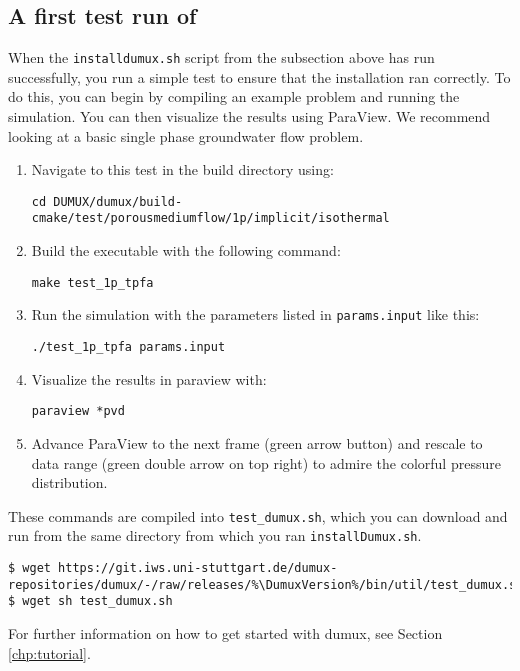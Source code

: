 \subsection{A first test run of \Dumux}
When the \texttt{installdumux.sh} script from the subsection above has run successfully,
you run a simple test to ensure that the installation ran correctly. To do this, you can
begin by compiling an example problem and running the simulation. You can then visualize
the results using ParaView. We recommend looking at a basic single phase groundwater flow problem.
\begin{enumerate}
\item Navigate to this test in the build directory using:
\begin{lstlisting}[style=Bash]
cd DUMUX/dumux/build-cmake/test/porousmediumflow/1p/implicit/isothermal
\end{lstlisting}
\item Build the executable with the following command:
\begin{lstlisting}[style=Bash]
make test_1p_tpfa
\end{lstlisting}
\item Run the simulation with the parameters listed in \texttt{params.input} like this:
\begin{lstlisting}[style=Bash]
./test_1p_tpfa params.input
\end{lstlisting}
\item Visualize the results in paraview with:
\begin{lstlisting}[style=Bash]
paraview *pvd
\end{lstlisting}
\item Advance ParaView to the next frame (green arrow button) and rescale to data range
(green double arrow on top right) to admire the colorful pressure distribution.
\end{enumerate}

These commands are compiled into \texttt{test\_dumux.sh}, which you can download and run
from the same directory from which you ran \texttt{installDumux.sh}.

\begin{lstlisting}[style=Bash,escapechar=\%]
$ wget https://git.iws.uni-stuttgart.de/dumux-repositories/dumux/-/raw/releases/%\DumuxVersion%/bin/util/test_dumux.sh
$ wget sh test_dumux.sh
\end{lstlisting}

For further information on how to get started with dumux, see Section \ref{chp:tutorial}.
